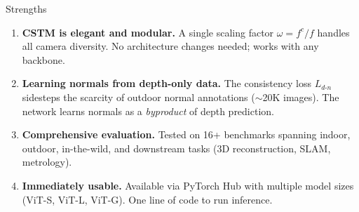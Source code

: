\begin{frame}{Strengths}
\begin{enumerate}
  \item \textbf{CSTM is elegant and modular.} A single scaling factor $\omega = f^c / f$ handles all camera diversity. No architecture changes needed; works with any backbone.

  \vspace{0.2cm}
  \item \textbf{Learning normals from depth-only data.} The consistency loss $L_{d\text{-}n}$ sidesteps the scarcity of outdoor normal annotations ($\sim$20K images). The network learns normals as a \textit{byproduct} of depth prediction.

  \vspace{0.2cm}
  \item \textbf{Comprehensive evaluation.} Tested on 16+ benchmarks spanning indoor, outdoor, in-the-wild, and downstream tasks (3D reconstruction, SLAM, metrology).

  \vspace{0.2cm}
  \item \textbf{Immediately usable.} Available via PyTorch Hub with multiple model sizes (ViT-S, ViT-L, ViT-G). One line of code to run inference.
\end{enumerate}
\end{frame}
